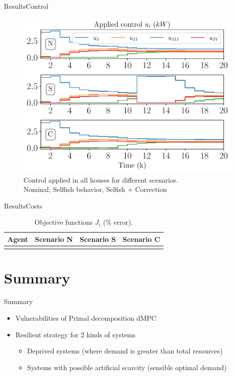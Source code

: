 \documentclass[aspectratio=169]{beamer}
\begin{document}
\begin{frame}{Results}{Control}
  \begin{figure}[h]
    \centering
     \includegraphics[width=.5\textwidth,trim=0 .1cm 0 .3cm,clip]{../img/resilient_ineq/control.pdf}
    \caption*{Control applied in all houses for different scenarios. \\ {} Nominal, {} Selflish behavior, {} Selfish + Correction}
  \end{figure}
\end{frame}

\begin{frame}{Results}{Costs}
  \begin{table}[h]
    \centering
    \caption*{Objective functions $J_{i}$ (\% error).}
    \begin{tabular}[t]{cccc}
      \toprule
      Agent  & Scenario N& Scenario S & Scenario C\\
      \midrule
      \\
      \bottomrule
    \end{tabular}
  \end{table}
\end{frame}

\section*{Summary}
\begin{frame}{Summary}
  \pause
    \begin{itemize}
      \item Vulnerabilities of Primal decomposition dMPC\pause
      \item Resilient strategy for 2 kinds of systems\pause
            \begin{itemize}
              \item Deprived systems (where demand is greater than total resources)\pause
              \item Systems with possible artificial scarcity (sensible optimal demand)
            \end{itemize}
    \end{itemize}
\end{frame}
\end{document}
